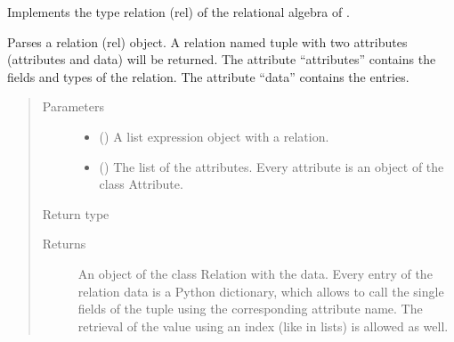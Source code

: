 \documentclass[letterpaper,10pt,english]{sphinxmanual}
\begin{document}
\begin{fulllineitems}
\label{\detokenize{index:secondodb.api.algebras.secondorelationalalgebra.Relation}}
Implements the type relation (rel) of the relational algebra of .

\end{fulllineitems}


\begin{fulllineitems}
\label{\detokenize{index:secondodb.api.algebras.secondorelationalalgebra.parse_relation}}
Parses a relation (rel) object. A relation named tuple with two attributes (attributes and data) will be returned.
The attribute “attributes” contains the fields and types of the relation. The attribute “data” contains the entries.
\begin{quote}\begin{description}
\item[{Parameters}] \leavevmode\begin{itemize}
\item {} 
 () \textendash{} A list expression object with a relation.

\item {} 
 (\sphinxstyleliteralemphasis{\sphinxupquote{{[}}}\sphinxstyleliteralemphasis{\sphinxupquote{{]}}}) \textendash{} The list of the attributes. Every attribute is an object of the class Attribute.

\end{itemize}

\item[{Return type}] \leavevmode
{\hyperref[\detokenize{index:secondodb.api.algebras.secondorelationalalgebra.Relation}]{}}

\item[{Returns}] \leavevmode
An object of the class Relation with the data. Every entry of the relation data is a Python dictionary,
which allows to call the single fields of the tuple using the corresponding attribute name. The retrieval
of the value using an index (like in lists) is allowed as well.

\end{description}\end{quote}

\end{fulllineitems}
\end{document}
